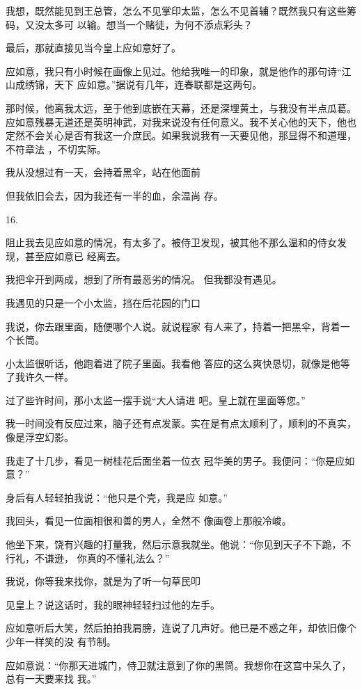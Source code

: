 \documentclass{article}
\begin{document}
我想，既然能见到王总管，怎么不见掌印太监，怎么不见首辅？既然我只有这些筹码，又没太多可
以输。想当一个赌徒，为何不添点彩头？ 


最后，那就直接见当今皇上应如意好了。 

应如意，我只有小时候在画像上见过。他给我唯一的印象，就是他作的那句诗“江山成绣锦，天下
应如意。”据说有几年，连春联都是这两句。 

那时候，他离我太远，至于他到底嵌在天幕，还是深埋黄土，与我没有半点瓜葛。应如意残暴无道还是英明神武，对我来说没有任何意义。我不关心他的天下，他也定然不会关心是否有我这一介庶民。如果我说我有一天要见他，那显得不和道理，不符章法
，不切实际。 

我从没想过有一天，会持着黑伞，站在他面前
\newpage


但我依旧会去，因为我还有一半的血，余温尚
存。 


16. 

阻止我去见应如意的情况，有太多了。被侍卫发现，被其他不那么温和的侍女发现，甚至应如意已
经离去。 

我把伞开到两成，想到了所有最恶劣的情况。
但我都没有遇见。 

我遇见的只是一个小太监，挡在后花园的门口

我说，你去跟里面，随便哪个人说。就说程家
有人来了，持着一把黑伞，背着一个长筒。 

小太监很听话，他跑着进了院子里面。我看他
答应的这么爽快恳切，就像是他等了我许久一样。 

\newpage

过了些许时间，那小太监一摆手说“大人请进
吧。皇上就在里面等您。” 

我一时间没有反应过来，脑子还有点发蒙。实在是有点太顺利了，顺利的不真实，像是浮空幻影。

我走了十几步，看见一树桂花后面坐着一位衣
冠华美的男子。我便问：“你是应如意？” 

身后有人轻轻拍我说：“他只是个壳，我是应
如意。” 

我回头，看见一位面相很和善的男人，全然不
像画卷上那般冷峻。 

他坐下来，饶有兴趣的打量我，然后示意我就坐。他说：“你见到天子不下跪，不行礼，不谦逊，
你真的不懂礼法么？” 

我说，你等我来找你，就是为了听一句草民叩

\newpage
见皇上？说这话时，我的眼神轻轻扫过他的左手。 

应如意听后大笑，然后拍拍我肩膀，连说了几声好。他已是不惑之年，却依旧像个少年一样笑的没
有节制。 

应如意说：“你那天进城门，侍卫就注意到了你的黑筒。我想你在这宫中呆久了，总有一天要来找
我。” 
\end{document}
